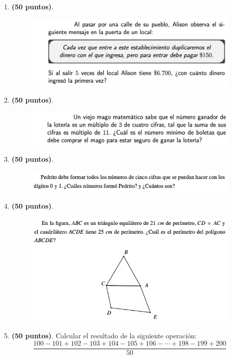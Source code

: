 \begin{enumerate}
	\item \textbf{(50 puntos)}. 
				\begin{figure}[H]
					\centering
					\includegraphics[width=0.95\linewidth]{2020_08_15/imgs/basicoproblema1}
					\label{fig:basicoproblema1}
				\end{figure}
			
	\item \textbf{(50 puntos)}. 
				\begin{figure}[H]
					\centering
					\includegraphics[width=0.95\linewidth]{2020_08_15/imgs/basicoproblema2}
					\label{fig:basicoproblema2}
				\end{figure}
	
		\item \textbf{(50 puntos)}. 
				\begin{figure}[H]
					\centering
					\includegraphics[width=0.95\linewidth]{2020_08_15/imgs/p8basico}
					\label{fig:basicoproblema3}
				\end{figure}

	\item \textbf{(50 puntos)}. 
			\begin{figure}[H]
				\centering
				\includegraphics[width=0.95\linewidth]{2020_08_15/imgs/p9basico}
				\label{fig:basicoproblema4}
			\end{figure}
		
	\item \textbf{(50 puntos)}. Calcular el resultado de la siguiente operación:
	\[
	\frac{100-101+102-103+104-105+106-\cdots +198-199+200}{50}
	\]
\end{enumerate}
